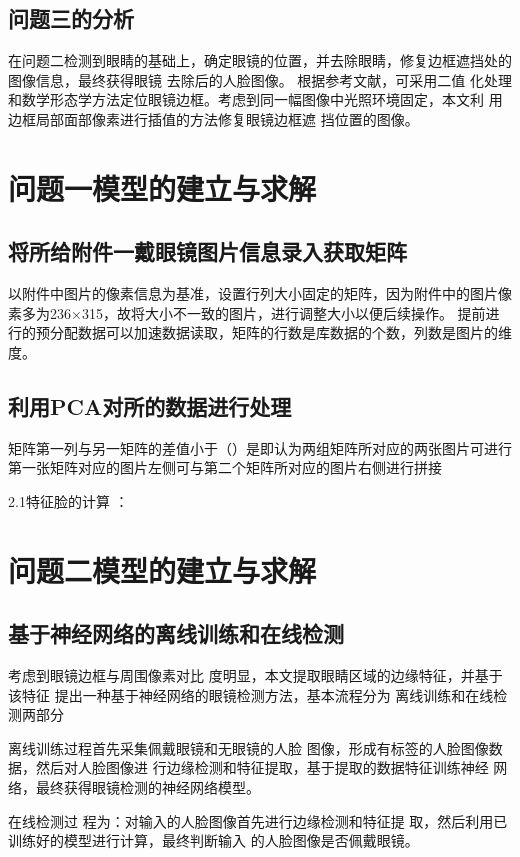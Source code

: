 \documentclass[12pt]{article}
\begin{document}
{       \subsection{问题三的分析}%
       在问题二检测到眼睛的基础上，确定眼镜的位置，并去除眼睛，修复边框遮挡处的图像信息，最终获得眼镜
去除后的人脸图像。
根据参考文献，可采用二值
化处理和数学形态学方法定位眼镜边框。考虑到同一幅图像中光照环境固定，本文利
用边框局部面部像素进行插值的方法修复眼镜边框遮
挡位置的图像。


       {\centering\section{问题一模型的建立与求解}}
       \subsection{将所给附件一戴眼镜图片信息录入获取矩阵}
      \par 以附件中图片的像素信息为基准，设置行列大小固定的矩阵，因为附件中的图片像素多为236×315，故将大小不一致的图片，进行调整大小以便后续操作。
      提前进行的预分配数据可以加速数据读取，矩阵的行数是库数据的个数，列数是图片的维度。
      

      \subsection{利用PCA对所的数据进行处理}
      矩阵第一列与另一矩阵的差值小于（）是即认为两组矩阵所对应的两张图片可进行第一张矩阵对应的图片左侧可与第二个矩阵所对应的图片右侧进行拼接
        
      2.1特征脸的计算 ：  


      


       {\centering\section{问题二模型的建立与求解}}
       
       \subsection{基于神经网络的离线训练和在线检测}
       考虑到眼镜边框与周围像素对比
度明显，本文提取眼睛区域的边缘特征，并基于该特征
提出一种基于神经网络的眼镜检测方法，基本流程分为
离线训练和在线检测两部分\par 
离线训练过程首先采集佩戴眼镜和无眼镜的人脸
图像，形成有标签的人脸图像数据，然后对人脸图像进
行边缘检测和特征提取，基于提取的数据特征训练神经
网络，最终获得眼镜检测的神经网络模型。\par 
在线检测过
程为：对输入的人脸图像首先进行边缘检测和特征提
取，然后利用已训练好的模型进行计算，最终判断输入
的人脸图像是否佩戴眼镜。
}
\end{document}
